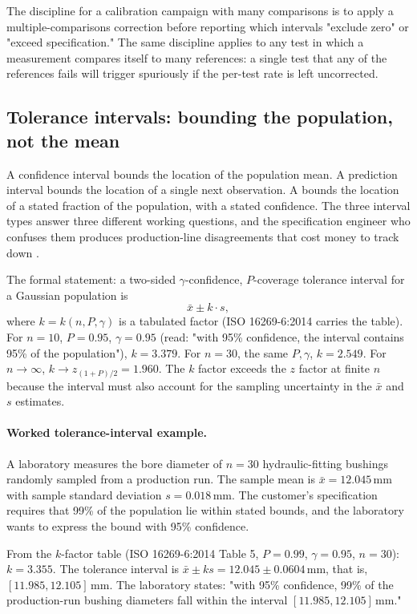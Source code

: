 The discipline for a calibration campaign with many comparisons is
to apply a multiple-comparisons correction before reporting which
intervals "exclude zero" or "exceed specification." The same
discipline applies to any test in which a measurement compares
itself to many references: a single test that any of the
references fails will trigger spuriously if the per-test rate is
left uncorrected.

\subsection{Tolerance intervals: bounding the population, not the mean}

A confidence interval bounds the location of the population mean. A
prediction interval bounds the location of a single next observation.
A  bounds the location of a stated
fraction of the population, with a stated confidence. The three
interval types answer three different working questions, and the
specification engineer who confuses them produces production-line
disagreements that cost money to track down
\cite{text:ch04t3-meeker-prediction-2017}.

The formal statement: a two-sided $\gamma$-confidence,
$P$-coverage tolerance interval for a Gaussian population is
\[
\bar{x} \pm k \cdot s,
\]
where $k = k(n, P, \gamma)$ is a tabulated factor (ISO 16269-6:2014
\cite{std:ch04t3-iso16269-6} carries the table). For
$n = 10$, $P = 0.95$, $\gamma = 0.95$ (read: "with 95\% confidence,
the interval contains 95\% of the population"), $k = 3.379$. For
$n = 30$, the same $P, \gamma$, $k = 2.549$. For $n \to \infty$,
$k \to z_{(1+P)/2} = 1.960$. The $k$ factor exceeds the $z$
factor at finite $n$ because the interval must also account for the
sampling uncertainty in the $\bar{x}$ and $s$ estimates.

\paragraph{Worked tolerance-interval example.} A laboratory measures
the bore diameter of $n = 30$ hydraulic-fitting bushings randomly
sampled from a production run. The sample mean is $\bar{x} =
12.045\,\si{\milli\meter}$ with sample standard deviation
$s = 0.018\,\si{\milli\meter}$. The customer's specification requires
that 99\% of the population lie within stated bounds, and the
laboratory wants to express the bound with 95\% confidence.

From the $k$-factor table (ISO 16269-6:2014 Table 5, $P = 0.99$,
$\gamma = 0.95$, $n = 30$): $k = 3.355$. The tolerance interval is
$\bar{x} \pm k s = 12.045 \pm 0.0604\,\si{\milli\meter}$, that is,
$[11.985, 12.105]\,\si{\milli\meter}$. The laboratory states: "with
95\% confidence, 99\% of the production-run bushing diameters fall
within the interval $[11.985, 12.105]\,\si{\milli\meter}$."


